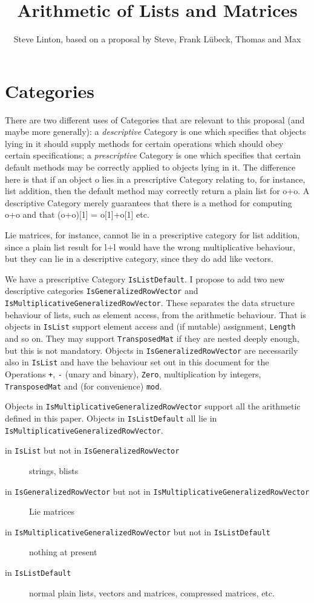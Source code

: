 \documentclass{article}
\title{Arithmetic of Lists and Matrices}
\author{Steve Linton, based on a proposal by Steve, Frank L\"ubeck,
Thomas and Max}
\begin{document}
\maketitle

\section{Categories}


There are two different uses of Categories that are relevant to this
proposal (and maybe more generally): a \emph{descriptive} Category is
one which specifies that objects lying in it should supply methods for 
certain operations which should obey certain specifications; a
\emph{prescriptive} Category is one which specifies that certain
default methods may be correctly applied to objects lying in it.  The
difference here is that if an object o lies in a prescriptive Category
relating to, for instance, list addition, then the default method may correctly
return a plain list for o+o.  A descriptive Category merely guarantees
that there is a method for computing o+o and that (o+o)[1] = o[1]+o[1] 
etc.

Lie matrices, for instance, cannot lie in a prescriptive category for
list addition, since a plain list result for l+l would have the wrong
multiplicative behaviour, but they can lie in a descriptive category,
since they do add like vectors.

We have a prescriptive Category \verb|IsListDefault|. I propose to add 
two new descriptive categories \verb|IsGeneralizedRowVector| and
\verb|IsMultiplicativeGeneralizedRowVector|.
These separates the data structure behaviour of lists, such as element
access, from the arithmetic behaviour. That is objects in
\verb|IsList| support element access and (if mutable) assignment,
\verb|Length| and so on. They may support
\verb|TransposedMat| if they are nested deeply enough, but this is not 
mandatory. Objects in
\verb|IsGeneralizedRowVector| are necessarily also in \verb|IsList|
and have the behaviour set out in this document for the Operations
\verb|+|, \verb|-| (unary and binary), \verb|Zero|, multiplication by
integers, \verb|TransposedMat| and (for
convenience) \verb|mod|.

Objects in \verb|IsMultiplicativeGeneralizedRowVector| support all the 
arithmetic defined in this paper. Objects in \verb|IsListDefault| all
lie in \verb|IsMultiplicativeGeneralizedRowVector|.


\begin{description}
\item[in \texttt{IsList} but not in \texttt{IsGeneralizedRowVector}]
strings, blists
\item[in \texttt{IsGeneralizedRowVector} but not in
\texttt{IsMultiplicativeGeneralizedRowVector}] Lie matrices
\item[in \texttt{IsMultiplicativeGeneralizedRowVector} but not in
\texttt{IsListDefault}]  nothing at present
\item[in \texttt{IsListDefault}] normal plain lists, vectors and
matrices, compressed matrices, etc.
\end{description}
\end{document}

